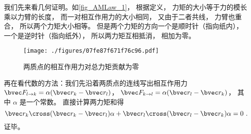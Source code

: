 我们先来看几何证明。如\autoref{fig_AMLaw_1}， 根据定义， 力矩的大小等于力的模长乘以力臂的长度， 而一对相互作用力的大小相同， 又由于二者共线， 力臂也重合， 所以两个力矩大小相等。 但是两个力矩的方向一个是顺时针（指向纸内）， 一个是逆时针（指向纸外）， 所以两力矩互相抵消， 相加为零。

\begin{figure}[ht]
\centering
\texttt{[image: ./figures/07fe87f671f76c96.pdf]}
\caption{两质点的相互作用力对总力矩贡献为零}\label{fig_AMLaw_1}
\end{figure}

再在看代数的方法：我们先沿着两质点的连线写出相互作用力 $\bvec F_{l\to k} = \alpha(\bvec r_k - \bvec r_l)$， $\bvec F_{k\to l} = \alpha(\bvec r_l - \bvec r_k)$， 其中 $\alpha$ 是一个常数。 直接计算两力矩和得
\begin{equation}
\bvec r_k \cross (\bvec r_k - \bvec r_l)\alpha + \bvec r_l \cross (\bvec r_l - \bvec r_k)\alpha = 0~.
\end{equation}
证毕。

